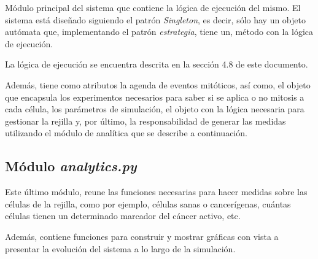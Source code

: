 Módulo principal del sistema que contiene la lógica de ejecución del mismo. El sistema
está diseñado siguiendo el patrón \textit{Singleton}, es decir, sólo hay un objeto
autómata que, implementando el patrón \textit{estrategia}, tiene un, método con
la lógica de ejecución.

La lógica de ejecución se encuentra descrita en la sección 4.8 de este documento.

Además, tiene como atributos la agenda de eventos mitóticos, así como, el objeto que
encapsula los experimentos necesarios para saber si se aplica o no mitosis a cada célula, los
parámetros de simulación, el objeto con la lógica necesaria para gestionar la rejilla y, por último,
la responsabilidad de generar las medidas utilizando el módulo de analítica que se describe a continuación.

\subsection{Módulo \textit{analytics.py}}

Este último módulo, reune las funciones necesarias para hacer medidas sobre las células
de la rejilla, como por ejemplo, células sanas o cancerígenas, cuántas células tienen un
determinado marcador del cáncer activo, etc.

Además, contiene funciones para construir y mostrar gráficas con vista a presentar la evolución
del sistema a lo largo de la simulación.
